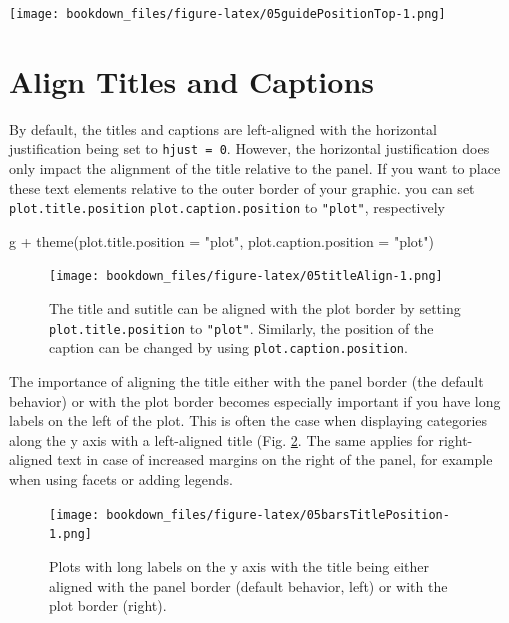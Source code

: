 \documentclass[
]{krantz}
\makeatletter
\newenvironment{Shaded}{\begin{snugshade}}{\end{snugshade}}
\newcommand{\AttributeTok}[1]{\textcolor[rgb]{0.61,0.61,0.61}{#1}}
\newcommand{\FunctionTok}[1]{\textcolor[rgb]{0,0,0}{#1}}
\newcommand{\NormalTok}[1]{#1}
\newcommand{\SpecialCharTok}[1]{\textcolor[rgb]{0,0,0}{#1}}
\newcommand{\StringTok}[1]{\textcolor[rgb]{0.5,0.5,0.5}{#1}}
\newenvironment{kframe}{%
\medskip{}
\setlength{\fboxsep}{.8em}
 \def\at@end@of@kframe{}%
 \ifinner\ifhmode%
  \def\at@end@of@kframe{\end{minipage}}%
  \begin{minipage}{\columnwidth}%
 \fi\fi%
 \def\FrameCommand##1{\hskip\@totalleftmargin \hskip-\fboxsep
 \colorbox{shadecolor}{##1}\hskip-\fboxsep
     \hskip-\linewidth \hskip-\@totalleftmargin \hskip\columnwidth}%
 \MakeFramed {\advance\hsize-\width
   \@totalleftmargin\z@ \linewidth\hsize
   \@setminipage}}%
 {\par\unskip\endMakeFramed%
 \at@end@of@kframe}
\renewenvironment{Shaded}{\begin{kframe}}{\end{kframe}}
\makeatother
\begin{document}
\texttt{[image: bookdown\_files/figure-latex/05guidePositionTop-1.png]}

\hypertarget{align-titles-and-captions}{%
\section{Align Titles and Captions}\label{align-titles-and-captions}}

By default, the titles and captions are left-aligned with the horizontal justification being set to \texttt{hjust\ =\ 0}. However, the horizontal justification does only impact the alignment of the title relative to the panel. If you want to place these text elements relative to the outer border of your graphic. you can set \texttt{plot.title.position} \texttt{plot.caption.position} to \texttt{"plot"}, respectively

\begin{Shaded}
\begin{Highlighting}[]
\NormalTok{g }\SpecialCharTok{+} \FunctionTok{theme}\NormalTok{(}\AttributeTok{plot.title.position =} \StringTok{"plot"}\NormalTok{,}
          \AttributeTok{plot.caption.position =} \StringTok{"plot"}\NormalTok{)}
\end{Highlighting}
\end{Shaded}

\begin{figure}
\centering
\texttt{[image: bookdown\_files/figure-latex/05titleAlign-1.png]}
\caption{\label{fig:05titleAlign}The title and sutitle can be aligned with the plot border by setting \texttt{plot.title.position} to \texttt{"plot"}. Similarly, the position of the caption can be changed by using \texttt{plot.caption.position}.}
\end{figure}

The importance of aligning the title either with the panel border (the default behavior) or with the plot border becomes especially important if you have long labels on the left of the plot. This is often the case when displaying categories along the y axis with a left-aligned title (Fig. \ref{fig:05barsTitlePosition}. The same applies for right-aligned text in case of increased margins on the right of the panel, for example when using facets or adding legends.

\begin{figure}
\centering
\texttt{[image: bookdown\_files/figure-latex/05barsTitlePosition-1.png]}
\caption{\label{fig:05barsTitlePosition}Plots with long labels on the y axis with the title being either aligned with the panel border (default behavior, left) or with the plot border (right).}
\end{figure}
\end{document}
